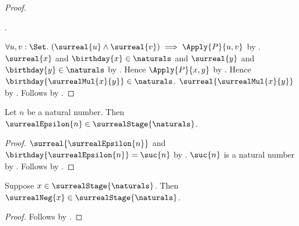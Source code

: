 \begin{proof}
\begin{subproof}
\begin{subproof}
                .
        \end{subproof}
    \end{subproof}
    $\forall u,v:\Set.\ (\surreal{u}\land\surreal{v})
        \implies\Apply{P}{u,v}$
        by .
    $\surreal{x}$ and $\birthday{x}\in\naturals$ and
        $\surreal{y}$ and $\birthday{y}\in\naturals$
        by .
    Hence $\Apply{P}{x,y}$ by \auto.
    Hence $\birthday{\surrealMul{x}{y}}\in\naturals$.
    $\surreal{\surrealMul{x}{y}}$ by .
    Follows by
        .
\end{proof}

\begin{proposition}\label{surreal_epsilon_in_finite_stage}
    Let $n$ be a natural number.
    Then $\surrealEpsilon{n}\in\surrealStage{\naturals}$.
\end{proposition}
\begin{proof}
    $\surreal{\surrealEpsilon{n}}$ and
        $\birthday{\surrealEpsilon{n}}=\suc{n}$
        by .
    $\suc{n}$ is a natural number by .
    Follows by
        .
\end{proof}

\begin{proposition}\label{surreal_negation_finite_stage}
    Suppose $x\in\surrealStage{\naturals}$.
    Then $\surrealNeg{x}\in\surrealStage{\naturals}$.
\end{proposition}
\begin{proof}
    Follows by
        .
\end{proof}

